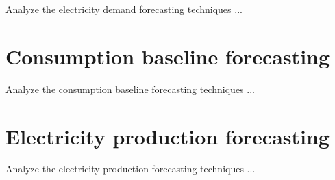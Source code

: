Analyze the electricity demand forecasting techniques ...


\section{Consumption baseline forecasting}
\label{sec:baselinesoa}
\vspace{0.2 cm}

Analyze the consumption baseline forecasting techniques ...


\section{Electricity production forecasting}
\label{sec:productionsoa}
\vspace{0.2 cm}

Analyze the electricity production forecasting techniques ...
